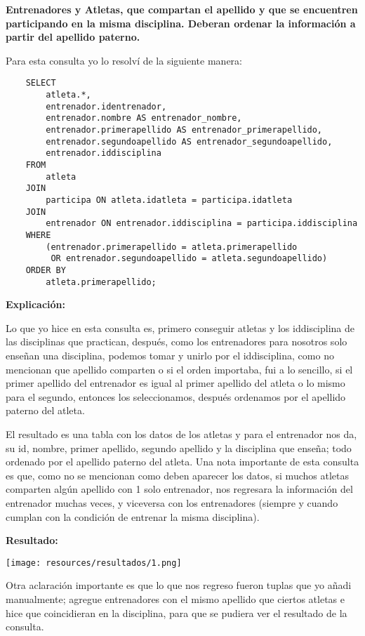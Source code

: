 \textbf{Entrenadores y Atletas, que compartan el apellido y que se encuentren participando en la misma disciplina.
Deberan ordenar la información a partir del apellido paterno.}\vspace{.3cm}

Para esta consulta yo lo resolví de la siguiente manera: \vspace{.3cm}

\begin{lstlisting}
    SELECT 
        atleta.*,
        entrenador.identrenador,
        entrenador.nombre AS entrenador_nombre,
        entrenador.primerapellido AS entrenador_primerapellido,
        entrenador.segundoapellido AS entrenador_segundoapellido,
        entrenador.iddisciplina
    FROM 
        atleta
    JOIN 
        participa ON atleta.idatleta = participa.idatleta
    JOIN 
        entrenador ON entrenador.iddisciplina = participa.iddisciplina
    WHERE 
        (entrenador.primerapellido = atleta.primerapellido 
         OR entrenador.segundoapellido = atleta.segundoapellido)
    ORDER BY 
        atleta.primerapellido;
\end{lstlisting}

\textbf{Explicación:} \vspace{.3cm}

Lo que yo hice en esta consulta es, primero conseguir atletas y los iddisciplina de las disciplinas que practican, después, como los entrenadores para nosotros solo enseñan una disciplina, podemos tomar y unirlo por el iddisciplina, como no mencionan que apellido comparten o si el orden importaba, fui a lo sencillo, si el primer apellido del entrenador es igual al primer apellido del atleta o lo mismo para el segundo, entonces los seleccionamos, después ordenamos por el apellido paterno del atleta. \vspace{.3cm}

El resultado es una tabla con los datos de los atletas y para el entrenador nos da, su id, nombre, primer apellido, segundo apellido y la disciplina que enseña; todo ordenado por el apellido paterno del atleta. Una nota importante de esta consulta es que, como no se mencionan como deben aparecer los datos, si muchos atletas comparten algún apellido con 1 solo entrenador, nos regresara la información del entrenador muchas veces, y viceversa con los entrenadores (siempre y cuando cumplan con la condición de entrenar la misma disciplina). \vspace{.3cm}

\textbf{Resultado:}
\begin{center}
    \texttt{[image: resources/resultados/1.png]}
\end{center}   

Otra aclaración importante es que lo que nos regreso fueron tuplas que yo añadi manualmente; agregue entrenadores con el mismo apellido que ciertos atletas e hice que coincidieran en la disciplina, para que se pudiera ver el resultado de la consulta. \vspace{.3cm}